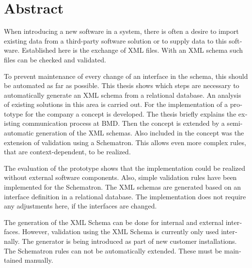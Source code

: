 \chapter{Abstract}

\begin{english} %
When introducing a new software in a system, there is often a desire to import existing data from a third-party software solution or to supply data to this software. Established here is the exchange of XML files. With an XML schema such files can be checked and validated.

To prevent maintenance of every change of an interface in the schema, this should be automated as far as possible.
This thesis shows which steps are necessary to automatically generate an XML schema from a relational database.
An analysis of existing solutions in this area is carried out.
For the implementation of a prototype for the company \BMD a concept is developed. The thesis briefly explains the existing communication process at BMD. Then the concept is extended by a semi-automatic generation of the XML schemas. Also included in the concept was the extension of validation using a Schematron. This allows even more complex rules, that are context-dependent, to be realized.

The evaluation of the prototype shows that the implementation could be realized without external software components. Also, simple validation rules have been implemented for the Schematron. The XML schemas are generated based on an interface definition in a relational database. The implementation does not require any adjustments here, if the interfaces are changed.


The generation of the XML Schema can be done for internal and external interfaces. However, validation using the XML Schema is currently only used internally.
The generator is being introduced as part of new customer installations. The Schematron rules can not be automatically extended. These must be maintained manually.
\end{english}